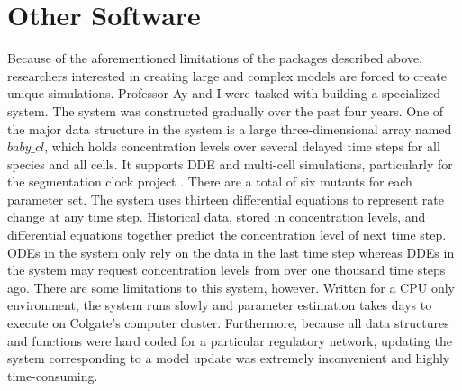 \documentclass[../thesis.tex]{subfiles}
\begin{document}
\section{Other Software}
	Because of the aforementioned limitations of the packages described above, researchers interested in creating large and complex models are forced to create unique simulations. Professor Ay and I were tasked with building a specialized system. The system was constructed gradually over the past four years.  One of the major data structure in the system is a large three-dimensional array named $baby\_cl$, which holds concentration levels over several delayed time steps for all species and all cells. It supports DDE and multi-cell simulations, particularly for the segmentation clock project \cite{ay2013short,ay2014spatial}. There are a total of six mutants for each parameter set. The system uses thirteen differential equations to represent rate change at any time step. Historical data, stored in concentration levels, and differential equations together predict the concentration level of next time step. ODEs in the system only rely on the data in the last time step whereas DDEs in the system may request concentration levels from over one thousand time steps ago. There are some limitations to this system, however. Written for a CPU only environment, the system runs slowly and parameter estimation takes days to execute on Colgate's computer cluster. Furthermore, because all data structures and functions were hard coded for a particular regulatory network, updating the system corresponding to a model update was extremely inconvenient and highly time-consuming.
\end{document}

